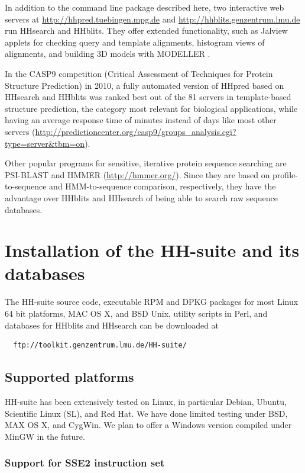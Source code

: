 \documentclass[11pt,a4paper]{article}
\begin{document}
In addition to the command line package described here, two interactive web servers at \url{http://hhpred.tuebingen.mpg.de} \cite{Soding:2005b, Hildebrand:2009} and \url{http://hhblits.genzentrum.lmu.de} run HHsearch and HHblits. They offer extended functionality, such as Jalview applets for checking query and template alignments, histogram views of alignments, and building 3D models with MODELLER \cite{Sali:1993}. 

In the CASP9 competition (Critical Assessment of Techniques for Protein Structure Prediction) in 2010, a fully automated version of HHpred based on HHsearch and HHblits was ranked best out of the 81 servers in template-based structure prediction, the category most relevant for biological applications, while having an average response time of minutes instead of days like most other servers \cite{Mariani:2011} (\url{http://predictioncenter.org/casp9/groups_analysis.cgi?type=server&tbm=on}). 

Other popular programs for sensitive, iterative protein sequence searching are PSI-BLAST \cite{Altschul:1997} and HMMER (\url{http://hmmer.org/}). Since they are based on profile-to-sequence and HMM-to-sequence comparison, respectively, they have the advantage over HHblits and HHsearch of being able to search raw sequence databases.


\section{Installation of the HH-suite and its databases}

The HH-suite source code, executable RPM and DPKG packages for most Linux 64 bit platforms, MAC OS X, and BSD Unix, utility scripts in Perl, and databases for HHblits and HHsearch can be downloaded at
\begin{verbatim}
  ftp://toolkit.genzentrum.lmu.de/HH-suite/
\end{verbatim}

\subsection{Supported platforms} \label{installation}

HH-suite has been extensively tested on Linux, in particular Debian, Ubuntu, Scientific Linux (SL), and Red Hat. We have done limited testing under BSD, MAX OS X, and CygWin. We plan to offer a Windows version compiled under MinGW in the future.

\subsubsection*{Support for SSE2 instruction set} 
\end{document}

